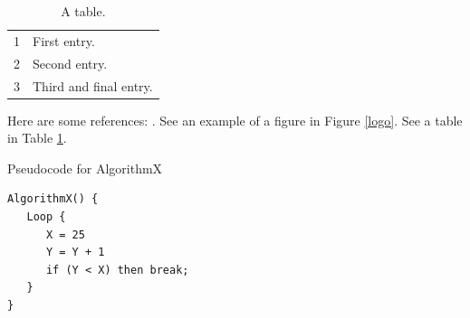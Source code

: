 \begin{table}[h]
\caption{A table.}
\label{tabledata}
\begin{tabular}{rl}
1 & First entry.\\
2 & Second entry.\\
3 & Third and final entry.
\end{tabular}
\end{table}
Here are some references: \cite{CateniCollaVannucci:, ChiHyuckLeeParkLee:, GoldbergDE:}.
See an example of a figure in Figure \ref{logo}.
See a table in Table \ref{tabledata}.

\begin{table}[b]
\caption{Pseudocode for AlgorithmX}
\label{algorithmX}
\begin{verbatim}
AlgorithmX() {
   Loop {
      X = 25
      Y = Y + 1
      if (Y < X) then break;
   }
}
\end{verbatim}
\end{table}

